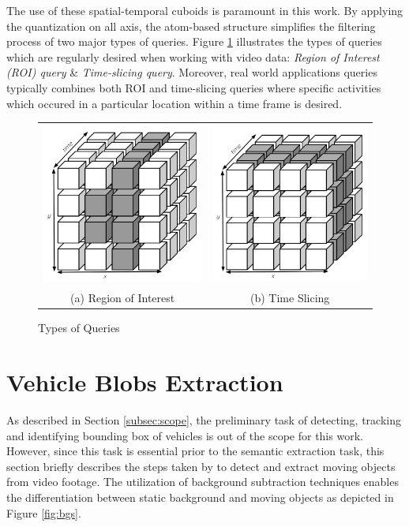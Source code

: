 The use of these spatial-temporal cuboids is paramount in this work.
By applying the quantization on all axis, the atom-based structure simplifies the filtering process of two major types of queries.
Figure \ref{fig:typesofQuery} illustrates the types of queries which are regularly desired when working with video data: \textit{Region of Interest (ROI) query} \& \textit{Time-slicing query}.
Moreover, real world applications queries typically combines both ROI and time-slicing queries where specific activities which occured in a particular location within a time frame is desired.


\begin{figure}[htb!]
  \centering


\begin{tabular}{cc}
 \includegraphics[width=0.3\linewidth]{image/general/atom_ROI.PNG} &  \includegraphics[width=0.3\linewidth]{image/general/atom_time_slicing.PNG}\\
(a) Region of Interest & (b) Time Slicing
\end{tabular}


\caption{Types of Queries} \label{fig:typesofQuery}
\end{figure}



\section{Vehicle Blobs Extraction}
\label{subsection:fundamental}

As described in Section \ref{subsec:scope}, the preliminary task of detecting, tracking and identifying bounding box of vehicles is out of the scope for this work. However, since this task is essential prior to the semantic extraction task, this section briefly describes the steps taken by  to detect and extract moving objects from video footage. The utilization of background subtraction techniques enables the differentiation between static background and moving objects as depicted in Figure \ref{fig:bgs}.


